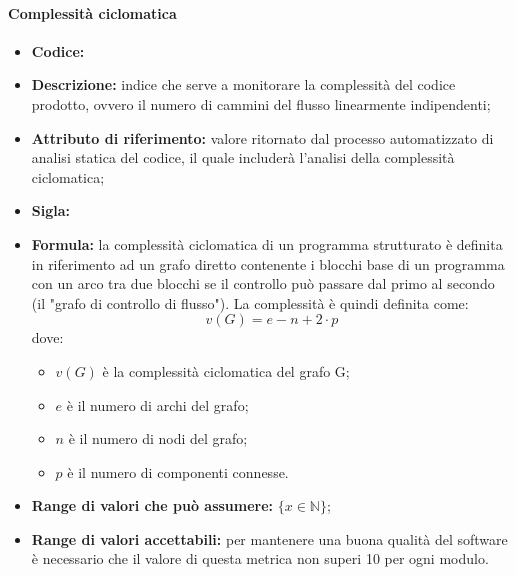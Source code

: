 \paragraph{Complessità ciclomatica}
\begin{itemize}
    \item \textbf{Codice:}
    \item \textbf{Descrizione:} indice che serve a monitorare la complessità del codice prodotto, ovvero il numero di cammini del flusso linearmente indipendenti;
    \item \textbf{Attributo di riferimento:} valore ritornato dal processo automatizzato di analisi statica del codice, il quale includerà l'analisi della complessità ciclomatica;
    \item \textbf{Sigla:}
    \item \textbf{Formula:} la complessità ciclomatica di un programma strutturato è definita in riferimento ad un grafo diretto contenente i blocchi
    base di un programma con un arco tra due blocchi se il controllo può passare dal primo al secondo (il "grafo di controllo di flusso"). La complessità è
    quindi definita come:
            \[
                v(G)=e-n+2\cdot p
            \]
    dove:
        \begin{itemize}
            \item $v(G)$ è la complessità ciclomatica del grafo G;
            \item $e$ è il numero di archi del grafo;
            \item $n$ è il numero di nodi del grafo;
            \item $p$ è il numero di componenti connesse.
        \end{itemize}
    \item \textbf{Range di valori che può assumere:} $\{x \in \mathbb{N} \}$;
    \item \textbf{Range di valori accettabili:} per mantenere una buona qualità del software è necessario che il valore di questa metrica non superi
    10 per ogni modulo.
\end{itemize}

